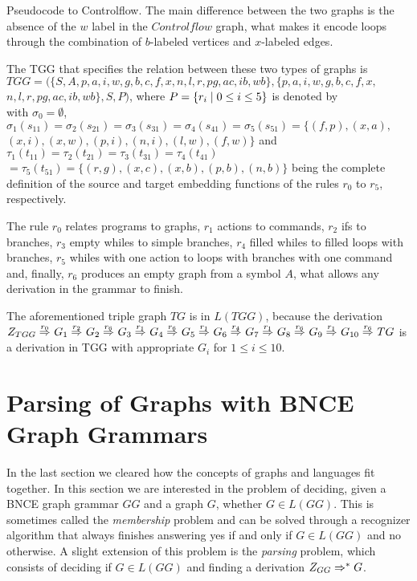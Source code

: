 \documentclass[]{report}
\begin{document}
\begin{example}{Pseudocode to Controlflow.}
	The main difference between the two graphs is the absence of the $w$ label in the $Controlflow$ graph, what makes it encode loops through the combination of $b$-labeled vertices and $x$-labeled edges.
	
	The TGG that specifies the relation between these two types of graphs is $TGG = (\{S, A, p, a, i, w, g, b, c, f, x, n, l, r, pg, ac, ib, wb\}, \{p, a, i, w, g, b, c, f, x,$ $ n, l, r, pg, ac, ib, wb\}, S, P)$, where $P = \{r_i \; | \; 0 \le i \le 5\}$ is denoted by\\
	
	
	\noindent
	with $\sigma_0 = \emptyset$, $\sigma_1(s_{11}) = \sigma_2(s_{21}) = \sigma_3(s_{31}) = \sigma_4(s_{41}) =\sigma_5(s_{51}) = \{ (f,p), (x,a), $ $(x,i), (x,w), (p,i), (n,i), (l,w), (f,w) \}$ and $\tau_1(t_{11}) = \tau_2(t_{21}) = \tau_3(t_{31}) = \tau_4(t_{41}) $ $= \tau_5(t_{51}) = \{ (r,g), (x,c), (x,b), (p,b), (n,b)\}$ being the complete definition of the source and target embedding functions of the rules $r_0$ to $r_5$, respectively.
	
	The rule $r_0$ relates programs to graphs, $r_1$ actions to commands, $r_2$ ifs to branches, $r_3$ empty whiles to simple branches, $r_4$ filled whiles to filled loops with branches, $r_5$ whiles with one action to loops with branches with one command and, finally, $r_6$ produces an empty graph from a symbol $A$, what allows any derivation in the grammar to finish.
	
	The aforementioned triple graph $TG$ is in $L(TGG)$, because the derivation
	$
	\startTG{TGG} \tderiv{r_0}{}{} G_1 \tderiv{r_2}{}{} G_2 \tderiv{r_6}{}{} G_3 \tderiv{r_1}{}{} G_4 \tderiv{r_6}{}{} G_5 \tderiv{r_1}{}{} G_6 \tderiv{r_4}{}{} G_7 \tderiv{r_1}{}{} G_8 \tderiv{r_6}{}{} G_9 \tderiv{r_1}{}{} G_{10} \tderiv{r_6}{}{} TG
	$
	is a derivation in TGG with appropriate $G_i$ for $1 \le i \le 10$.
\end{example}

\section{Parsing of Graphs with BNCE Graph Grammars}
In the last section we cleared how the concepts of graphs and languages fit together. In this section we are interested in the problem of deciding, given a BNCE graph grammar $GG$ and a graph $G$, whether $G \in L(GG)$. This is sometimes called the \textit{membership} problem and can be solved through a recognizer algorithm that always finishes answering yes if and only if $G \in L(GG)$ and no otherwise. A slight extension of this problem is the \textit{parsing} problem, which consists of deciding if $G \in L(GG)$ and finding a derivation $Z_{GG} \Rightarrow^*_{} G$.
\end{document}
